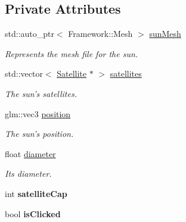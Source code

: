 \subsection*{Private Attributes}
\begin{DoxyCompactItemize}
\item 
\hypertarget{class_sun_a1aa72a3e0baeabd76642c48b969abf99}{std\-::auto\-\_\-ptr$<$ Framework\-::\-Mesh $>$ \hyperlink{class_sun_a1aa72a3e0baeabd76642c48b969abf99}{sun\-Mesh}}\label{class_sun_a1aa72a3e0baeabd76642c48b969abf99}

\begin{DoxyCompactList}\small\item\em Represents the mesh file for the sun. \end{DoxyCompactList}\item 
\hypertarget{class_sun_a0e5857745c6be53c3e2a6e518ff291d6}{std\-::vector$<$ \hyperlink{class_satellite}{Satellite} $\ast$ $>$ \hyperlink{class_sun_a0e5857745c6be53c3e2a6e518ff291d6}{satellites}}\label{class_sun_a0e5857745c6be53c3e2a6e518ff291d6}

\begin{DoxyCompactList}\small\item\em The sun's satellites. \end{DoxyCompactList}\item 
\hypertarget{class_sun_acab91a34acacee79bb743089738da5cc}{glm\-::vec3 \hyperlink{class_sun_acab91a34acacee79bb743089738da5cc}{position}}\label{class_sun_acab91a34acacee79bb743089738da5cc}

\begin{DoxyCompactList}\small\item\em The sun's position. \end{DoxyCompactList}\item 
\hypertarget{class_sun_ac35fc9ebc427d9c8c9fd3ee3a12fce82}{float \hyperlink{class_sun_ac35fc9ebc427d9c8c9fd3ee3a12fce82}{diameter}}\label{class_sun_ac35fc9ebc427d9c8c9fd3ee3a12fce82}

\begin{DoxyCompactList}\small\item\em Its {\itshape diameter}. \end{DoxyCompactList}\item 
\hypertarget{class_sun_a1c33d5e99fc2c6d51a43043504ecb9a4}{int {\bfseries satellite\-Cap}}\label{class_sun_a1c33d5e99fc2c6d51a43043504ecb9a4}

\item 
\hypertarget{class_sun_aa7d9c22a62eed3d761394d0acd87c5a3}{bool {\bfseries is\-Clicked}}\label{class_sun_aa7d9c22a62eed3d761394d0acd87c5a3}

\end{DoxyCompactItemize}


